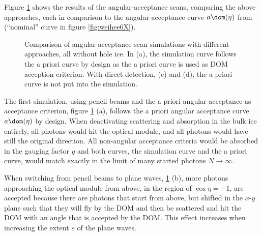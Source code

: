 
Figure \ref{fig:Shai8yah} shows the results of the angular-acceptance scans, comparing the above approaches, each in comparison to the angular-acceptance curve $a\dom(\eta)$ from \cite{icepaper} (``nominal'' curve in figure \ref{fig:weihee6X}).

\begin{figure}[htbp]
  \hfill
  \hfill
  \hfill
  \caption{Comparison of angular-acceptance-scan simulations with different approaches, all without hole ice. In (a), the simulation curve follows the a priori curve by design as the a priori curve is used as DOM acception criterion. With direct detection, (c) and (d), the a priori curve is not put into the simulation.}
  \label{fig:Shai8yah}
\end{figure}

The first simulation, using pencil beams and the a priori angular acceptance as acceptance criterion, figure \ref{fig:Shai8yah} (a), follows the a priori angular acceptance curve $a\dom(\eta)$ by design. When deactivating scattering and absorption in the bulk ice entirely, all photons would hit the optical module, and all photons would have still the original direction. All non-angular acceptance criteria would be absorbed in the gauging factor $g$ and both curves, the simulation curve and the a priori curve, would match exactly in the limit of many started photons $N\rightarrow\infty$.

When switching from pencil beams to plane waves, \ref{fig:Shai8yah} (b), more photons approaching the optical module from above, in the region of $\cos \eta = -1$, are accepted because there are photons that start from above, but shifted in the $x$-$y$ plane such that they will fly by the DOM and then be scattered and hit the DOM with an angle that is accepted by the DOM. This effect increases when increasing the extent $e$ of the plane waves.

